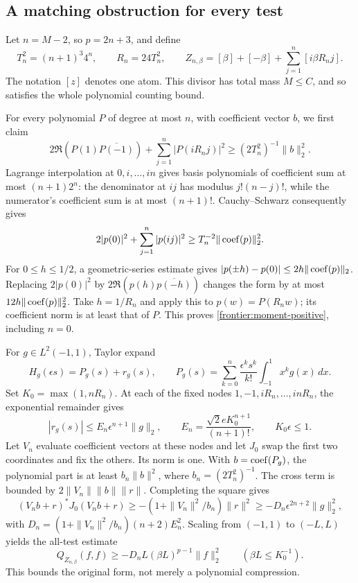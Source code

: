 \subsection{A matching obstruction for every test}
Let \(n=M-2\), so \(p=2n+3\), and define
\begin{equation}\label{frontier:lower-screen}
 T_n^2=(n+1)^3 4^n,\qquad R_n=24T_n^2,\qquad
 Z_{n,\beta}=[\beta]+[-\beta]+\sum_{j=1}^n[i\beta R_nj].
\end{equation}
The notation \([z]\) denotes one atom. This divisor has total mass
\(M\le C\), and so satisfies the whole polynomial counting bound.

For every polynomial \(P\) of degree at most \(n\), with
coefficient vector \(b\), we first claim
\begin{equation}\label{frontier:moment-positive}
 2\Re(P(1)\overline{P(-1)})+\sum_{j=1}^n|P(iR_nj)|^2
 \ge(2T_n^2)^{-1}\|b\|_2^2.
\end{equation}
Lagrange interpolation at \(0,i,\ldots,in\) gives basis
polynomials of coefficient sum at most \((n+1)2^n\): the
denominator at \(ij\) has modulus \(j!(n-j)!\), while the
numerator's coefficient sum is at most \((n+1)!\).
Cauchy--Schwarz consequently gives
\[
 2|p(0)|^2+\sum_{j=1}^n|p(ij)|^2\ge T_n^{-2}\|\operatorname{coef}(p)\|_2^2.
\]
For \(0\le h\le1/2\), a geometric-series estimate gives
\(|p(\pm h)-p(0)|\le2h\|\operatorname{coef}(p)\|_2\).
Replacing \(2|p(0)|^2\) by
\(2\Re(p(h)\overline{p(-h)})\) changes the form by at most
\(12h\|\operatorname{coef}(p)\|_2^2\). Take \(h=1/R_n\) and apply this
to \(p(w)=P(R_nw)\); its coefficient norm is at least that
of \(P\). This proves \eqref{frontier:moment-positive}, including
\(n=0\).

For \(g\in L^2(-1,1)\), Taylor expand
\[
 H_g(\epsilon s)=P_g(s)+r_g(s),\qquad
 P_g(s)=\sum_{k=0}^n\frac{\epsilon^ks^k}{k!}\int_{-1}^1x^kg(x)\,dx.
\]
Set \(K_0=\max(1,nR_n)\). At each of the fixed nodes
\(1,-1,iR_n,\ldots,inR_n\), the exponential remainder gives
\[
 |r_g(s)|\le E_n\epsilon^{n+1}\|g\|_2,\qquad
 E_n=\frac{\sqrt2 eK_0^{n+1}}{(n+1)!},\qquad K_0\epsilon\le1.
\]
Let \(V_n\) evaluate coefficient vectors at these nodes and let
\(J_0\) swap the first two coordinates and fix the others.
Its norm is one. With \(b=\operatorname{coef}(P_g)\), the polynomial part
is at least \(b_n\|b\|^2\), where \(b_n=(2T_n^2)^{-1}\).
The cross term is bounded by \(2\|V_n\|\|b\|\|r\|\).
Completing the square gives
\[
 (V_nb+r)^*J_0(V_nb+r)
 \ge-(1+\|V_n\|^2/b_n)\|r\|^2
 \ge-D_n\epsilon^{2n+2}\|g\|_2^2,
\]
with \(D_n=(1+\|V_n\|^2/b_n)(n+2)E_n^2\).
Scaling from \((-1,1)\) to \((-L,L)\) yields the all-test estimate
\begin{equation}\label{frontier:all-test-lower}
 Q_{Z_{n,\beta}}(f,f)\ge-D_nL(\beta L)^{p-1}\|f\|_2^2
 \qquad(\beta L\le K_0^{-1}).
\end{equation}
This bounds the original form, not merely a polynomial compression.

